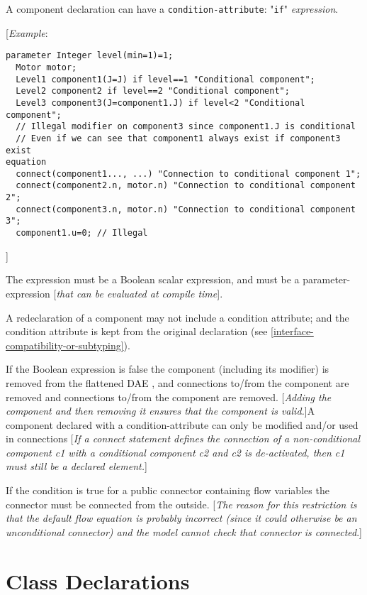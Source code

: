 A component declaration can have a \lstinline!condition-attribute!: "\lstinline!if!"
\emph{expression}.

{[}\emph{Example}:
\begin{lstlisting}[language=modelica]
  parameter Integer level(min=1)=1;
  Motor motor;
  Level1 component1(J=J) if level==1 "Conditional component";
  Level2 component2 if level==2 "Conditional component";
  Level3 component3(J=component1.J) if level<2 "Conditional component";
  // Illegal modifier on component3 since component1.J is conditional
  // Even if we can see that component1 always exist if component3 exist
equation
  connect(component1..., ...) "Connection to conditional component 1";
  connect(component2.n, motor.n) "Connection to conditional component 2";
  connect(component3.n, motor.n) "Connection to conditional component 3";
  component1.u=0; // Illegal
\end{lstlisting}

{]}

The expression must be a Boolean scalar expression, and must be a
parameter-expression {[}\emph{that can be evaluated at compile time}{]}.

A redeclaration of a component may not include a condition attribute;
and the condition attribute is kept from the original declaration (see
\autoref{interface-compatibility-or-subtyping}).

If the Boolean expression is false the component (including its
modifier) is removed from the flattened DAE , and connections to/from
the component are removed and connections to/from the component are
removed. {[}\emph{Adding the component and then removing it ensures that
the component is valid.}{]}A component declared with a
condition-attribute can only be modified and/or used in connections
{[}\emph{If a connect statement defines the connection of a
non-conditional component c1 with a conditional component c2 and c2 is
de-activated, then c1 must still be a declared element.}{]}

If the condition is true for a public connector containing flow
variables the connector must be connected from the outside. {[}\emph{The
reason for this restriction is that the default flow equation is
probably incorrect (since it could otherwise be an unconditional
connector) and the model cannot check that connector is connected}.{]}

\section{Class Declarations}

